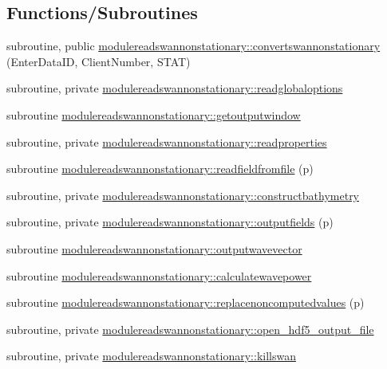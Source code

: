 \subsection*{Functions/\+Subroutines}
\begin{DoxyCompactItemize}
\item 
subroutine, public \mbox{\hyperlink{namespacemodulereadswannonstationary_adb8e6556bbf5f51e70fbc7c10af87a70}{modulereadswannonstationary\+::convertswannonstationary}} (Enter\+Data\+ID, Client\+Number, S\+T\+AT)
\item 
subroutine, private \mbox{\hyperlink{namespacemodulereadswannonstationary_a3ca3fa603083a13bf688eeba197ef307}{modulereadswannonstationary\+::readglobaloptions}}
\item 
subroutine \mbox{\hyperlink{namespacemodulereadswannonstationary_a7fdb18d8cbff6e60af51a911dbea6813}{modulereadswannonstationary\+::getoutputwindow}}
\item 
subroutine, private \mbox{\hyperlink{namespacemodulereadswannonstationary_a2326a23b25b70dbf6d20a3f4395d864e}{modulereadswannonstationary\+::readproperties}}
\item 
subroutine \mbox{\hyperlink{namespacemodulereadswannonstationary_ab9855fa733bd4b591442908062b5e2cd}{modulereadswannonstationary\+::readfieldfromfile}} (p)
\item 
subroutine, private \mbox{\hyperlink{namespacemodulereadswannonstationary_a75a35cae0f8c8f39af652fdec1a65e65}{modulereadswannonstationary\+::constructbathymetry}}
\item 
subroutine, private \mbox{\hyperlink{namespacemodulereadswannonstationary_a0dbbbf2bfd33dfe83b35c14911f575dc}{modulereadswannonstationary\+::outputfields}} (p)
\item 
subroutine \mbox{\hyperlink{namespacemodulereadswannonstationary_a9381741247025c8f7b4fd4b06c7b9815}{modulereadswannonstationary\+::outputwavevector}}
\item 
subroutine \mbox{\hyperlink{namespacemodulereadswannonstationary_a8c548e44bcbe106ea2fb8ef9f9aae7a1}{modulereadswannonstationary\+::calculatewavepower}}
\item 
subroutine \mbox{\hyperlink{namespacemodulereadswannonstationary_a209b3d9c5ca27190c2be35a7d9bb9bce}{modulereadswannonstationary\+::replacenoncomputedvalues}} (p)
\item 
subroutine, private \mbox{\hyperlink{namespacemodulereadswannonstationary_adfb4e0c4deb8bcba31fe72f185128ace}{modulereadswannonstationary\+::open\+\_\+hdf5\+\_\+output\+\_\+file}}
\item 
subroutine, private \mbox{\hyperlink{namespacemodulereadswannonstationary_a568ac2906250752e8eb67fb713cc4212}{modulereadswannonstationary\+::killswan}}
\end{DoxyCompactItemize}
